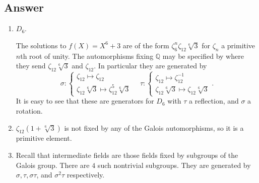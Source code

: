 \documentclass[11pt]{article}
\begin{document}
\subsection{Answer}
\begin{enumerate}
\item $D_6$.

The solutions to $f(X)=X^6+3$ are of the form $\zeta_6^n \zeta_{12} \sqrt[6]3$ for $\zeta_n$ a primitive $n$th root of unity. The automorphisms fixing $\mathbb{Q}$ may be specified by where they send $\zeta_{12}\sqrt[6]3$ and $\zeta_{12}$. In particular they are generated by 
\[\sigma: \left\{ \begin{array}{l} \zeta_{12} \mapsto \zeta_{12} \\ \zeta_{12} \sqrt[6]3 \mapsto \zeta_{12}^5 \sqrt[6]3 \end{array}\right. \quad \tau: \left\{ \begin{array}{l} \zeta_{12} \mapsto \zeta_{12}^{-1}  \\ \zeta_{12} \sqrt[6]3 \mapsto \zeta_{12} \sqrt[6]3 \end{array}\right. .\]
It is easy to see that these are generators for $D_6$ with $\tau$ a reflection, and $\sigma$ a rotation.
\item $\zeta_{12}(1+\sqrt[6] 3)$ is not fixed by any of the Galois automorphisms, so it is a primitive element.

\item Recall that intermediate fields are those fields fixed by subgroups of the Galois group. There are $4$ such nontrivial subgroups. They are generated by $\sigma, \tau, \sigma \tau$, and $\sigma^2 \tau$ respectively.


\end{enumerate}
\end{document}
